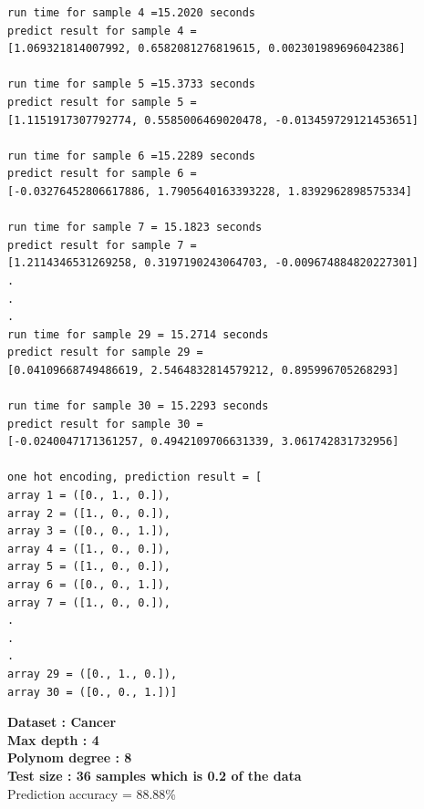 \documentclass[11pt]{article}
\begin{document}
\begin{lstlisting}
run time for sample 4 =15.2020 seconds
predict result for sample 4 =
[1.069321814007992, 0.6582081276819615, 0.002301989696042386]

run time for sample 5 =15.3733 seconds
predict result for sample 5 =
[1.1151917307792774, 0.5585006469020478, -0.013459729121453651]

run time for sample 6 =15.2289 seconds
predict result for sample 6 =
[-0.03276452806617886, 1.7905640163393228, 1.8392962898575334]

run time for sample 7 = 15.1823 seconds
predict result for sample 7 =
[1.2114346531269258, 0.3197190243064703, -0.009674884820227301]
.
.
.
run time for sample 29 = 15.2714 seconds
predict result for sample 29 =
[0.04109668749486619, 2.5464832814579212, 0.895996705268293]

run time for sample 30 = 15.2293 seconds
predict result for sample 30 =
[-0.0240047171361257, 0.4942109706631339, 3.061742831732956]

one hot encoding, prediction result = [
array 1 = ([0., 1., 0.]), 
array 2 = ([1., 0., 0.]), 
array 3 = ([0., 0., 1.]),
array 4 = ([1., 0., 0.]), 
array 5 = ([1., 0., 0.]), 
array 6 = ([0., 0., 1.]), 
array 7 = ([1., 0., 0.]),
.
.
.
array 29 = ([0., 1., 0.]), 
array 30 = ([0., 0., 1.])]
\end{lstlisting}
\newpage
\textbf{Dataset : Cancer}\\
\textbf{Max depth : 4}\\
\textbf{Polynom degree : 8 }\\
\textbf{Test size : 36 samples which is 0.2 of the data}\\
\large {Prediction accuracy = 88.88\%}\\
\end{document}
